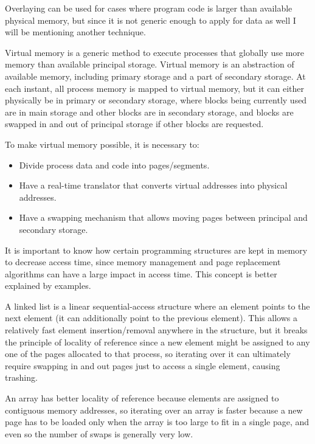 \documentclass{sope}
\begin{document}
{
Overlaying can be used for cases where program code is larger than available physical memory, but since it is not generic enough to apply for data as well I will be mentioning another technique.

Virtual memory is a generic method to execute processes that globally use more memory than available principal storage. Virtual memory is an abstraction of available memory, including primary storage and a part of secondary storage. At each instant, all process memory is mapped to virtual memory, but it can either physically be in primary or secondary storage, where blocks being currently used are in main storage and other blocks are in secondary storage, and blocks are swapped in and out of principal storage if other blocks are requested.

To make virtual memory possible, it is necessary to:
\begin{itemize}
    \item Divide process data and code into pages/segments.
    \item Have a real-time translator that converts virtual addresses into physical addresses.
    \item Have a swapping mechanism that allows moving pages between principal and secondary storage.
\end{itemize}

It is important to know how certain programming structures are kept in memory to decrease access time, since memory management and page replacement algorithms can have a large impact in access time. This concept is better explained by examples.

A linked list is a linear sequential-access structure where an element points to the next element (it can additionally point to the previous element). This allows a relatively fast element insertion/removal anywhere in the structure, but it breaks the principle of locality of reference since a new element might be assigned to any one of the pages allocated to that process, so iterating over it can ultimately require swapping in and out pages just to access a single element, causing trashing.

An array has better locality of reference because elements are assigned to contiguous memory addresses, so iterating over an array is faster because a new page has to be loaded only when the array is too large to fit in a single page, and even so the number of swaps is generally very low.

}
\end{document}
